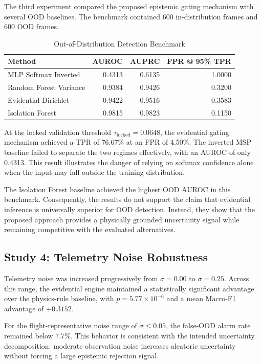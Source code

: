 \documentclass[conference]{IEEEtran}
\begin{document}
The third experiment compared the proposed epistemic gating mechanism with
several OOD baselines. The benchmark contained 600 in-distribution frames and
600 OOD frames.

\begin{table}[t]
\centering
\caption{Out-of-Distribution Detection Benchmark}
\label{tab:ood}
\small
\begin{tabular}{lrrr}
\toprule
Method & AUROC & AUPRC & FPR @ 95\% TPR\\
\midrule
MLP Softmax Inverted & 0.4313 & 0.6135 & 1.0000\\
Random Forest Variance & 0.9384 & 0.9426 & 0.3200\\
Evidential Dirichlet & 0.9422 & 0.9516 & 0.3583\\
Isolation Forest & 0.9815 & 0.9823 & 0.1150\\
\bottomrule
\end{tabular}
\end{table}

At the locked validation threshold $\tau_{\mathrm{locked}}=0.0648$, the
evidential gating mechanism achieved a TPR of 76.67\% at an FPR of 4.50\%.
The inverted MSP baseline failed to separate the two regimes effectively,
with an AUROC of only 0.4313. This result illustrates the danger of relying
on softmax confidence alone when the input may fall outside the training
distribution.

The Isolation Forest baseline achieved the highest OOD AUROC in this
benchmark. Consequently, the results do not support the claim that
evidential inference is universally superior for OOD detection. Instead, they
show that the proposed approach provides a physically grounded uncertainty
signal while remaining competitive with the evaluated alternatives.

\subsection{Study 4: Telemetry Noise Robustness}

Telemetry noise was increased progressively from $\sigma=0.00$ to
$\sigma=0.25$. Across this range, the evidential engine maintained a
statistically significant advantage over the physics-rule baseline, with
$p=5.77\times10^{-6}$ and a mean Macro-F1 advantage of $+0.3152$.

For the flight-representative noise range of $\sigma\leq0.05$, the false-OOD
alarm rate remained below 7.7\%. This behavior is consistent with the intended
uncertainty decomposition: moderate observation noise increases aleatoric
uncertainty without forcing a large epistemic rejection signal.
\end{document}
